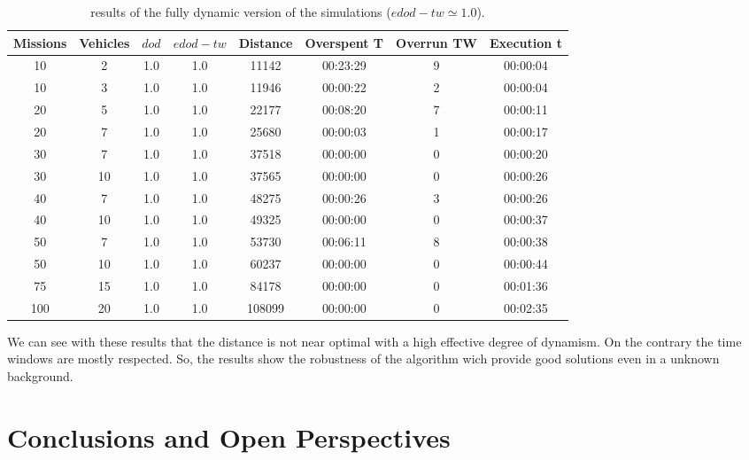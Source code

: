 \documentclass[a4paper,10pt]{article}
\begin{document}
  \small
\begin{table}[h]
  \begin{center}
    \begin{tabular}{|c|c|c|c|c|c|c|c|} 
    \hline
    \bf{Missions} & \bf{Vehicles} & \bf{$dod$} & \bf{$edod-tw$} & \bf{Distance} & \bf{Overspent T} & \bf{Overrun TW} &  \bf{Execution t} \\ \hline
    10	 & 2 	& 1.0	& 1.0	& 11142	& 00:23:29	& 9	& 00:00:04\\
    10	 & 3 	& 1.0	& 1.0	& 11946	& 00:00:22	& 2	& 00:00:04\\
    20	 & 5 	& 1.0	& 1.0	& 22177	& 00:08:20	& 7	& 00:00:11\\
    20	 & 7 	& 1.0	& 1.0	& 25680	& 00:00:03	& 1	& 00:00:17\\
    30	 & 7 	& 1.0	& 1.0	& 37518	& 00:00:00	& 0	& 00:00:20\\
    30	 & 10 	& 1.0	& 1.0	& 37565	& 00:00:00	& 0	& 00:00:26\\
    40	 & 7 	& 1.0	& 1.0	& 48275	& 00:00:26	& 3	& 00:00:26\\
    40	 & 10 	& 1.0	& 1.0	& 49325	& 00:00:00	& 0	& 00:00:37\\
    50	 & 7 	& 1.0	& 1.0	& 53730	& 00:06:11	& 8	& 00:00:38\\
    50	 & 10 	& 1.0	& 1.0	& 60237	& 00:00:00	& 0	& 00:00:44\\
    75	 & 15 	& 1.0	& 1.0	& 84178	& 00:00:00	& 0	& 00:01:36\\
    100	 & 20 	& 1.0	& 1.0	& 108099& 00:00:00	& 0	& 00:02:35\\
    \hline
    \end{tabular}
  \caption{results of the fully dynamic version of the simulations ($edod-tw \simeq 1.0$).}
  \end{center}
\end{table}
  \normalsize

We can see with these results that the distance is not near optimal with a high effective degree of dynamism. On the contrary the time windows are mostly respected. So, the results show the robustness of the algorithm wich provide good solutions even in a unknown background.



\section{Conclusions and Open Perspectives}
\end{document}
